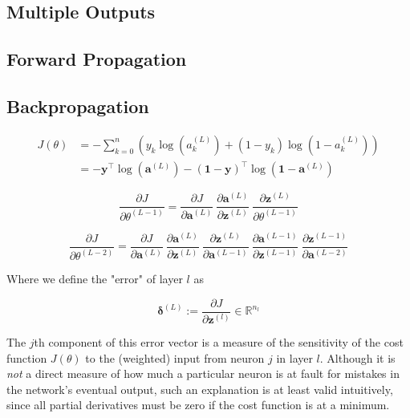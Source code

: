 \documentclass{article}
\begin{document}
    \subsection{Multiple Outputs}
    
    \subsection{Forward Propagation}

    \subsection{Backpropagation}
        
        
        $$ \begin{aligned}
        J(\theta) &= - \sum_{k=0}^{n} \left( y_k \log(a^{(L)}_k) + (1 - y_k) \log(1 - a^{(L)}_k) \right) \\
            &= -\mathbf{y}^\top \log(\mathbf{a}^{(L)}) - (\mathbf{1}-\mathbf{y})^\top \log(\mathbf{1} - \mathbf{a}^{(L)})
        \end{aligned} $$
        
        
        
        $$
        \frac{\partial J}{\partial \theta^{(L-1)}} =
            \frac{\partial J}{\partial \mathbf{a}^{(L)}} \
            \frac{\partial \mathbf{a}^{(L)}}{\partial \mathbf{z}^{(L)}} \
            \frac{\partial \mathbf{z}^{(L)}}{\partial \theta^{(L-1)}}
        $$



        $$
        \frac{\partial J}{\partial \theta^{(L-2)}} =
            \frac{\partial J}{\partial \mathbf{a}^{(L)}} \
            \frac{\partial \mathbf{a}^{(L)}}{\partial \mathbf{z}^{(L)}} \
            \frac{\partial \mathbf{z}^{(L)}}{\partial \mathbf{a}^{(L-1)}} \
            \frac{\partial \mathbf{a}^{(L-1)}}{\partial \mathbf{z}^{(L-1)}} \
            \frac{\partial \mathbf{z}^{(L-1)}}{\partial \mathbf{a}^{(L-2)}}
        $$



        Where we define the "error" of layer $l$ as
    
        $$
        \mathbf{\delta}^{(L)} :=  \frac{\partial J}{\partial \mathbf{z}^{(l)}} \in \mathbb{R}^{n_l}
        $$
        
        The $j$th component of this error vector is a measure of the sensitivity of the cost function $J(\theta)$ to the (weighted) input from neuron $j$ in layer $l$. Although it is \textit{not} a direct measure of how much a particular neuron is at fault for mistakes in the network's eventual output, such an explanation is at least valid intuitively, since all partial derivatives must be zero if the cost function is at a minimum.
        
\end{document}
